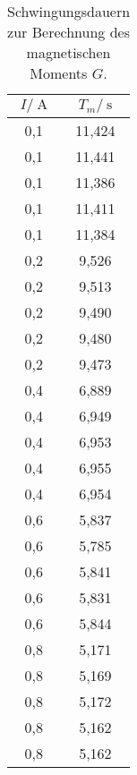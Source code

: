 \begin{table}
	\centering
	\begin{tabular}{cc}
	\toprule
	{$I/\:\si{\ampere}$} & {$T_m/\:\si{\second}$}\\
	\midrule
0,1 & 11,424 \\
0,1 & 11,441 \\
0,1 & 11,386 \\
0,1 & 11,411 \\
0,1 & 11,384 \\
0,2 &  9,526 \\
0,2 &  9,513 \\
0,2 &  9,490 \\
0,2 &  9,480 \\
0,2 &  9,473 \\
0,4 &  6,889 \\
0,4 &  6,949 \\
0,4 &  6,953 \\
0,4 &  6,955 \\
0,4 &  6,954 \\
0,6 &  5,837 \\
0,6 &  5,785 \\
0,6 &  5,841 \\
0,6 &  5,831 \\
0,6 &  5,844 \\
0,8 &  5,171 \\
0,8 &  5,169 \\
0,8 &  5,172 \\
0,8 &  5,162 \\
0,8 &  5,162 \\
	\bottomrule
	\end{tabular}
	\caption{Schwingungsdauern zur Berechnung des magnetischen Moments $G$.}
	\label{tab:T_m}
\end{table}
